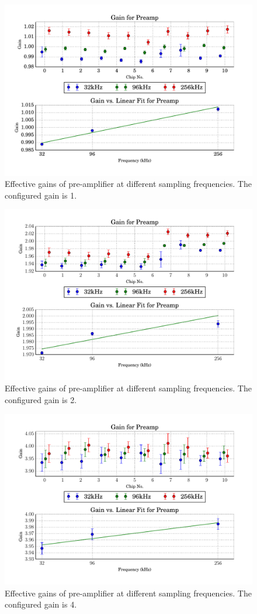 \begin{figure}
    \centering
    \includegraphics[width=.7\linewidth]{images/plots/dc_slope_preamp_gain+1.pdf}
    \caption{Effective gains of pre-amplifier at different sampling frequencies. The configured gain is 1.}
    \label{fig:preamp_slope+1}
\end{figure}
\begin{figure}
    \centering
    \includegraphics[width=.7\linewidth]{images/plots/dc_slope_preamp_gain+2.pdf}
    \caption{Effective gains of pre-amplifier at different sampling frequencies. The configured gain is 2.}
    \label{fig:preamp_slope+2}
\end{figure}
\begin{figure}
    \centering
    \includegraphics[width=.7\linewidth]{images/plots/dc_slope_preamp_gain+4.pdf}
    \caption{Effective gains of pre-amplifier at different sampling frequencies. The configured gain is 4.}
    \label{fig:preamp_slope+4}
\end{figure}
